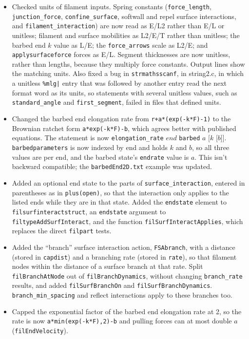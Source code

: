 \documentclass {scrbook}
\newcommand {\ttt} {\texttt}
\begin{document}
\begin{itemize}
\item Checked units of filament inputs. Spring constants (\ttt{force\_length}, \ttt{junction\_force}, \ttt{confine\_surface}, softwall and repel surface interactions, and \ttt{filament\_interaction}) are now read as E/L2 rather than E/L or unitless; filament and surface mobilities as L2/E/T rather than unitless; the barbed end $k$ value as L/E; the \ttt{force\_arrows} scale as L2/E; and \ttt{applysurfaceforce} forces as E/L. Segment thicknesses are now unitless, rather than lengths, because they multiply force constants. Output lines show the matching units. Also fixed a bug in \ttt{strmathsscanf}, in string2.c, in which a unitless \ttt{\%mlg|} entry that was followed by another entry read the next format word as its units, so statements with several unitless values, such as \ttt{standard\_angle} and \ttt{first\_segment}, failed in files that defined units.
\item Changed the barbed end elongation rate from \ttt{r+a*(exp(-k*F)-1)} to the Brownian ratchet form \ttt{a*exp(-k*F)-b}, which agrees better with published equations. The statement is now \ttt{elongation\_rate} $end$ \ttt{barbed} $a$ [$k$ [$b$]]. \ttt{barbedparameters} is now indexed by end and holds $k$ and $b$, so all three values are per end, and the barbed state's \ttt{endrate} value is $a$. This isn't backward compatible; the \ttt{barbedEnd2D.txt} example was updated.
\item Added an optional end state to the parts of \ttt{surface\_interaction}, entered in parentheses as in \ttt{plus(open)}, so that the interaction only applies to the listed ends while they are in that state. Added the \ttt{endstate} element to \ttt{filsurfinteractstruct}, an \ttt{endstate} argument to \ttt{filtypeAddSurfInteract}, and the function \ttt{filSurfInteractApplies}, which replaces the direct \ttt{filpart} tests.
\item Added the ``branch'' surface interaction action, \ttt{FSAbranch}, with a distance (stored in \ttt{capdist}) and a branching rate (stored in \ttt{rate}), so that filament nodes within the distance of a surface branch at that rate. Split \ttt{filBranchAtNode} out of \ttt{filBranchDynamics}, without changing \ttt{branch\_rate} results, and added \ttt{filSurfBranchOn} and \ttt{filSurfBranchDynamics}. \ttt{branch\_min\_spacing} and reflect interactions apply to these branches too.
\item Capped the exponential factor of the barbed end elongation rate at 2, so the rate is now \ttt{a*min(exp(-k*F),2)-b} and pulling forces can at most double $a$ (\ttt{filEndVelocity}).

\end{itemize}
\end{document}
